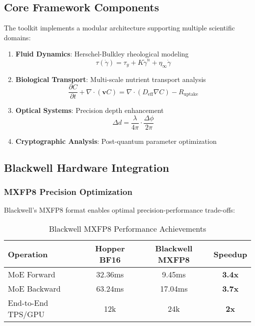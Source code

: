 \documentclass[11pt,a4paper]{article}
\newcommand{\result}[1]{\textcolor{resultcolor}{\textbf{#1}}}
\begin{document}
\subsection{Core Framework Components}

The toolkit implements a modular architecture supporting multiple scientific domains:

\begin{enumerate}
    \item \textbf{Fluid Dynamics}: Herschel-Bulkley rheological modeling
    \begin{equation}
    \tau(\dot{\gamma}) = \tau_y + K \dot{\gamma}^n + \eta_\infty \dot{\gamma}
    \end{equation}

    \item \textbf{Biological Transport}: Multi-scale nutrient transport analysis
    \begin{equation}
    \frac{\partial C}{\partial t} + \nabla \cdot (\mathbf{v}C) = \nabla \cdot (D_{\text{eff}} \nabla C) - R_{\text{uptake}}
    \end{equation}

    \item \textbf{Optical Systems}: Precision depth enhancement
    \begin{equation}
    \Delta d = \frac{\lambda}{4\pi} \cdot \frac{\Delta \phi}{2\pi}
    \end{equation}

    \item \textbf{Cryptographic Analysis}: Post-quantum parameter optimization
\end{enumerate}

\subsection{Blackwell Hardware Integration}

\subsubsection{MXFP8 Precision Optimization}
Blackwell's MXFP8 format enables optimal precision-performance trade-offs:

\begin{table}[H]
\centering
\caption{Blackwell MXFP8 Performance Achievements}
\label{tab:blackwell_performance}
\begin{tabular}{@{}lccc@{}}
\toprule
Operation & Hopper BF16 & Blackwell MXFP8 & Speedup \\
\midrule
MoE Forward & 32.36ms & 9.45ms & \result{3.4x} \\
MoE Backward & 63.24ms & 17.04ms & \result{3.7x} \\
End-to-End TPS/GPU & 12k & 24k & \result{2x} \\
\bottomrule
\end{tabular}
\end{table}
\end{document}
